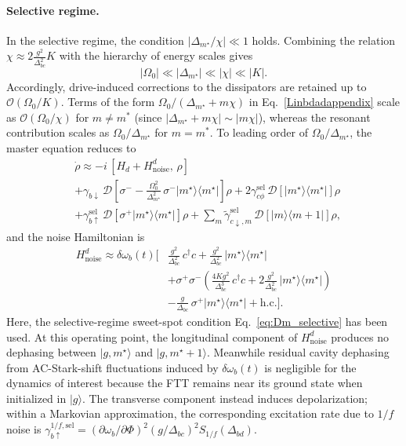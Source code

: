 \paragraph{Selective regime.}
In the selective regime, the condition $|\Delta_{m^\star}/\chi|\ll 1$ holds. Combining the relation $\chi \approx 2\frac{g^2}{\Delta_{bc}^2}K$ with the hierarchy of energy scales gives
\begin{equation}
|\Omega_0| \ll |\Delta_{m^\star}| \ll |\chi| \ll |K|.
\end{equation}
Accordingly, drive-induced corrections to the dissipators are retained up to $\mathcal{O}(\Omega_0/K)$. Terms of the form
$\Omega_0/(\Delta_{m^\star}+m\chi)$ in Eq.~\eqref{Linbdadappendix} scale as $\mathcal{O}(\Omega_0/\chi)$ for $m\neq m^*$ (since $|\Delta_{m^\star}+m\chi|\sim |m\chi|$), whereas the resonant contribution scales as $\Omega_0/\Delta_{m^\star}$ for $m=m^*$. To leading order of $\Omega_0/\Delta_{m^\star}$, the master equation reduces to
\begin{align}
&\dot{\rho} \approx -i\,[H_d + H_{\mathrm{noise}}^{d},\,\rho] \nonumber\\
&+ \gamma_{b\downarrow}\,\mathcal{D}\!\left[\sigma^- - \frac{\Omega_0^2}{\Delta_{m^\star}^2}\,\sigma^- |m^\star\rangle\langle m^\star|\right]\rho
+ 2\gamma_{c\phi}^{\mathrm{sel}}\,\mathcal{D}\!\left[|m^\star\rangle\langle m^\star|\right]\rho \nonumber\\
&+ \gamma_{b\uparrow}^{\mathrm{sel}}\,\mathcal{D}\!\left[\sigma^+ |m^\star\rangle\langle m^\star|\right]\rho
+ \sum_m \widetilde{\gamma}_{c\downarrow,m}^{\mathrm{sel}}\,\mathcal{D}\!\left[|m\rangle\langle m+1|\right]\rho ,
\end{align}
and the noise Hamiltonian is
\begin{align}
H_{\mathrm{noise}}^{d}
\approx \delta\omega_b(t)\Bigg[
&\frac{g^2}{\Delta_{bc}^2}\,c^\dagger c
+ \frac{g^2}{\Delta_{bc}^2}\,|m^\star\rangle\langle m^\star| \nonumber\\
&+ \sigma^+\sigma^-\!\left(\frac{4Kg^2}{\Delta_{bc}^3}\,c^\dagger c
+ 2\frac{g^2}{\Delta_{bc}^2}\,|m^\star\rangle\langle m^\star|\right) \nonumber\\
&- \frac{g}{\Delta_{bc}}\,\sigma^+ |m^\star\rangle\langle m^\star|
+ \mathrm{h.c.}
\Bigg].
\end{align}
Here, the selective-regime sweet-spot condition Eq.~\eqref{eq:Dm_selective} has been used. At this operating point, the longitudinal component of $H_{\mathrm{noise}}^{d}$ produces no dephasing between \(|g,m^\star\rangle\) and \(|g,m^\star+1\rangle\). Meanwhile residual cavity dephasing from AC-Stark-shift fluctuations induced by \(\delta\omega_b(t)\) is negligible for the dynamics of interest because the FTT remains near its ground state when initialized in \(|g\rangle\). The transverse component instead induces depolarization; within a Markovian approximation, the corresponding excitation rate due to \(1/f\) noise is
\(
\gamma_{b\uparrow}^{1/f,\mathrm{sel}}
= \left( \partial \omega_b / \partial \Phi \right)^2
\left( g / \Delta_{bc} \right)^2
S_{1/f}(\Delta_{bd}) .
\)

